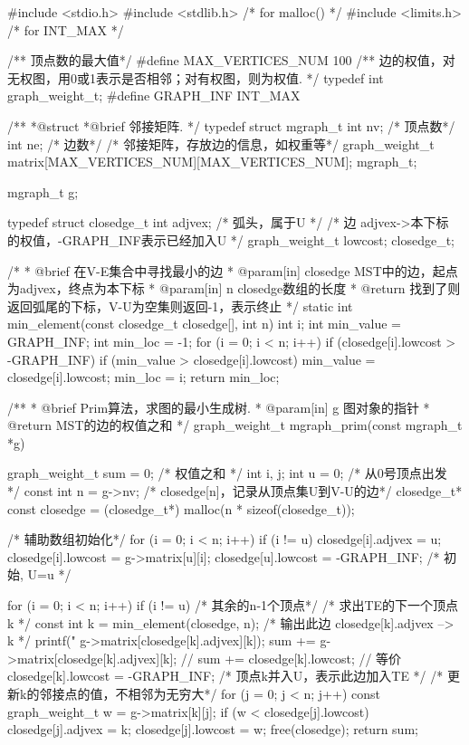 \begin{Codex}[label=mgraph_prim1.c]
#include <stdio.h>
#include <stdlib.h>  /* for malloc() */
#include <limits.h>  /* for INT_MAX */

/** 顶点数的最大值*/
#define MAX_VERTICES_NUM 100
/** 边的权值，对无权图，用0或1表示是否相邻；对有权图，则为权值. */
typedef int graph_weight_t;
#define GRAPH_INF INT_MAX

/**
 *@struct
 *@brief 邻接矩阵.
 */
typedef struct mgraph_t {
    int nv; /* 顶点数*/
    int ne; /* 边数*/
    /* 邻接矩阵，存放边的信息，如权重等*/
    graph_weight_t matrix[MAX_VERTICES_NUM][MAX_VERTICES_NUM];
} mgraph_t;

mgraph_t g;

typedef struct closedge_t {
    int adjvex; /* 弧头，属于U */
    /* 边 adjvex->本下标 的权值，-GRAPH_INF表示已经加入U */
    graph_weight_t lowcost;
} closedge_t;

/*
 * @brief 在V-E集合中寻找最小的边
 * @param[in] closedge MST中的边，起点为adjvex，终点为本下标
 * @param[in] n closedge数组的长度
 * @return 找到了则返回弧尾的下标，V-U为空集则返回-1，表示终止
 */
static int min_element(const closedge_t closedge[], int n) {
    int i;
    int min_value = GRAPH_INF;
    int min_loc = -1;
    for (i = 0; i < n; i++)
        if (closedge[i].lowcost > -GRAPH_INF) {
            if (min_value > closedge[i].lowcost) {
                min_value = closedge[i].lowcost;
                min_loc = i;
            }
        }
    return min_loc;
}

/**
 * @brief Prim算法，求图的最小生成树.
 * @param[in] g 图对象的指针
 * @return MST的边的权值之和
 */
graph_weight_t mgraph_prim(const mgraph_t *g) {
    graph_weight_t sum = 0; /* 权值之和 */
    int i, j;
    int u = 0; /* 从0号顶点出发 */
    const int n = g->nv;
    /* closedge[n]，记录从顶点集U到V-U的边*/
    closedge_t* const closedge = (closedge_t*) malloc(n * sizeof(closedge_t));

    /* 辅助数组初始化*/
    for (i = 0; i < n; i++) if (i != u) {
        closedge[i].adjvex = u;
        closedge[i].lowcost = g->matrix[u][i];
    }
    closedge[u].lowcost = -GRAPH_INF; /* 初始, U={u} */

    for (i = 0; i < n; i++) if (i != u) { /* 其余的n-1个顶点*/
        /* 求出TE的下一个顶点k */
        const int k = min_element(closedge, n);
        /* 输出此边 closedge[k].adjvex --> k */
        printf("%
                g->matrix[closedge[k].adjvex][k]);
        sum += g->matrix[closedge[k].adjvex][k];
        // sum += closedge[k].lowcost;  // 等价
        closedge[k].lowcost = -GRAPH_INF;  /* 顶点k并入U，表示此边加入TE */
        /* 更新k的邻接点的值，不相邻为无穷大*/
        for (j = 0; j < n; j++) {
            const graph_weight_t w = g->matrix[k][j];
            if (w < closedge[j].lowcost) {
                closedge[j].adjvex = k;
                closedge[j].lowcost = w;
            }
        }
    }
    free(closedge);
    return sum;
}


\end{Codex}
